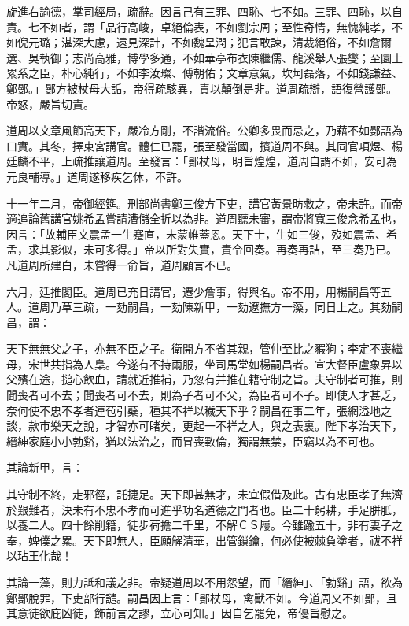 \begin{pinyinscope}
旋進右諭德，掌司經局，疏辭。因言己有三罪、四恥、七不如。三罪、四恥，以自責。七不如者，謂「品行高峻，卓絕倫表，不如劉宗周；至性奇情，無愧純孝，不如倪元璐；湛深大慮，遠見深計，不如魏呈潤；犯言敢諫，清裁絕俗，不如詹爾選、吳執御；志尚高雅，博學多通，不如華亭布衣陳繼儒、龍溪舉人張燮；至圜土累系之臣，朴心純行，不如李汝璨、傅朝佑；文章意氣，坎坷磊落，不如錢謙益、鄭鄤。」鄤方被杖母大詬，帝得疏駭異，責以顛倒是非。道周疏辯，語復營護鄤。帝怒，嚴旨切責。

道周以文章風節高天下，嚴冷方剛，不諧流俗。公卿多畏而忌之，乃藉不如鄤語為口實。其冬，擇東宮講官。體仁已罷，張至發當國，擯道周不與。其同官項煜、楊廷麟不平，上疏推讓道周。至發言：「鄤杖母，明旨煌煌，道周自謂不如，安可為元良輔導。」道周遂移疾乞休，不許。

十一年二月，帝御經筵。刑部尚書鄭三俊方下吏，講官黃景昉救之，帝未許。而帝適追論舊講官姚希孟嘗請漕儲全折以為非。道周聽未審，謂帝將寬三俊念希孟也，因言：「故輔臣文震孟一生蹇直，未蒙帷蓋恩。天下士，生如三俊，歿如震孟、希孟，求其影似，未可多得。」帝以所對失實，責令回奏。再奏再詰，至三奏乃已。凡道周所建白，未嘗得一俞旨，道周顧言不已。

六月，廷推閣臣。道周已充日講官，遷少詹事，得與名。帝不用，用楊嗣昌等五人。道周乃草三疏，一劾嗣昌，一劾陳新甲，一劾遼撫方一藻，同日上之。其劾嗣昌，謂：

天下無無父之子，亦無不臣之子。衛開方不省其親，管仲至比之豭狗；李定不喪繼母，宋世共指為人梟。今遂有不持兩服，坐司馬堂如楊嗣昌者。宣大督臣盧象昇以父殯在途，搥心飲血，請就近推補，乃忽有并推在籍守制之旨。夫守制者可推，則聞喪者可不去；聞喪者可不去，則為子者可不父，為臣者可不子。即使人才甚乏，奈何使不忠不孝者連苞引蘗，種其不祥以穢天下乎？嗣昌在事二年，張網溢地之談，款市樂天之說，才智亦可睹矣，更起一不祥之人，與之表裏。陛下孝治天下，縉紳家庭小小勃谿，猶以法治之，而冒喪斁倫，獨謂無禁，臣竊以為不可也。

其論新甲，言：

其守制不終，走邪徑，託捷足。天下即甚無才，未宜假借及此。古有忠臣孝子無濟於艱難者，決未有不忠不孝而可進乎功名道德之門者也。臣二十躬耕，手足胼胝，以養二人。四十餘削籍，徒步荷擔二千里，不解ＣＳ屨。今雖踰五十，非有妻子之奉，婢僕之累。天下即無人，臣願解清華，出管鎖鑰，何必使被棘負塗者，祓不祥以玷王化哉！

其論一藻，則力詆和議之非。帝疑道周以不用怨望，而「縉紳」、「勃谿」語，欲為鄭鄤脫罪，下吏部行譴。嗣昌因上言：「鄤杖母，禽獸不如。今道周又不如鄤，且其意徒欲庇凶徒，飾前言之謬，立心可知。」因自乞罷免，帝優旨慰之。


\end{pinyinscope}
